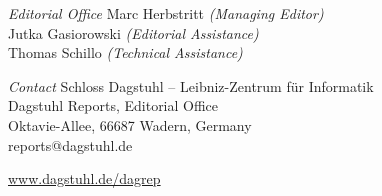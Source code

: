 \documentclass[a4paper,USenglish]{dagrep-master}
\begin{document}
\begin{publicationinfo}
\bigskip
\emph{Editorial Office}\newline
Marc Herbstritt \emph{(Managing Editor)}\\
Jutka Gasiorowski \emph{(Editorial Assistance)}\\
Thomas Schillo \emph{(Technical Assistance)}

\bigskip
\emph{Contact}\newline
Schloss Dagstuhl -- Leibniz-Zentrum f\"ur Informatik\\
Dagstuhl Reports, Editorial Office\\
Oktavie-Allee, 66687 Wadern, Germany\\ 
reports@dagstuhl.de


\vfill

\href{http://www.dagstuhl.de/dagrep}{www.dagstuhl.de/dagrep}

  
\end{publicationinfo}
\end{document}

